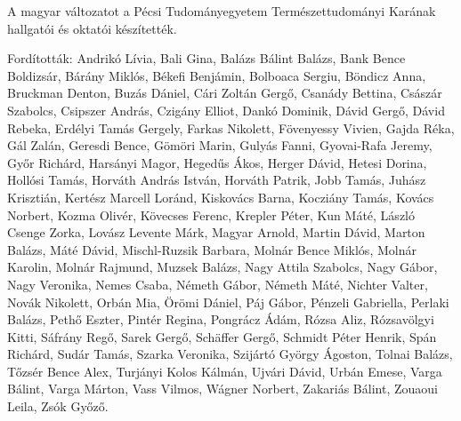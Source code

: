 {
A magyar változatot a Pécsi Tudományegyetem Természettudományi Karának hallgatói és oktatói készítették.

Fordították:
Andrikó Lívia,
Bali Gina, Balázs Bálint Balázs, Bank Bence Boldizsár, Bárány Miklós,
Békefi Benjámin, Bolboaca Sergiu, Böndicz Anna, Bruckman Denton, Buzás Dániel,
Cári Zoltán Gergő, Csanády Bettina, Császár Szabolcs, Csipszer András, Czigány Elliot,
Dankó Dominik, Dávid Gergő, Dávid Rebeka, Erdélyi Tamás Gergely,
Farkas Nikolett, Fövenyessy Vivien,
Gajda Réka, Gál Zalán, Geresdi Bence, Gömöri Marin, Gulyás Fanni, Gyovai-Rafa Jeremy, Győr Richárd,
Harsányi Magor, Hegedűs Ákos, Herger Dávid, Hetesi Dorina, Hollósi Tamás, Horváth András István, Horváth Patrik,
Jobb Tamás, Juhász Krisztián,
Kertész Marcell Loránd, Kiskovács Barna, Kocziány Tamás, Kovács Norbert, Kozma Olivér, Kövecses Ferenc, Krepler Péter, Kun Máté,
László Csenge Zorka, Lovász Levente Márk,
Magyar Arnold, Martin Dávid, Marton Balázs, Máté Dávid, Mischl-Ruzsik Barbara, Molnár Bence Miklós, Molnár Karolin, Molnár Rajmund, Muzsek Balázs,
Nagy Attila Szabolcs, Nagy Gábor, Nagy Veronika, Nemes Csaba, Németh Gábor, Németh Máté, Nichter Valter, Novák Nikolett,
Orbán Mia, Örömi Dániel,
Páj Gábor, Pénzeli Gabriella, Perlaki Balázs, Pethő Eszter, Pintér Regina, Pongrácz Ádám,
Rózsa Aliz, Rózsavölgyi Kitti,
Sáfrány Regő, Sarek Gergő, Schäffer Gergő, Schmidt Péter Henrik, Spán Richárd, Sudár Tamás,
Szarka Veronika, Szijártó György Ágoston,
Tolnai Balázs, Tőzsér Bence Alex, Turjányi Kolos Kálmán, Ujvári Dávid, Urbán Emese,
Varga Bálint, Varga Márton, Vass Vilmos, Wágner Norbert, Zakariás Bálint, Zouaoui Leila, Zsók Győző.
}